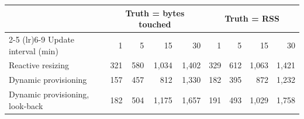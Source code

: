 \begin{tabular}{lrrrrrrrr}
\toprule
 & \multicolumn{4}{c}{Truth = bytes touched} & \multicolumn{4}{c}{Truth = RSS} \\
\cmidrule(lr){2-5} \cmidrule(lr){6-9}
Update interval (min) & 1 & 5 & 15 & 30 & 1 & 5 & 15 & 30 \\
\midrule
Reactive resizing & 321 & 580 & 1{,}034 & 1{,}402 & 329 & 612 & 1{,}063 & 1{,}421 \\
Dynamic provisioning & 157 & 457 & 812 & 1{,}330 & 182 & 395 & 872 & 1{,}232 \\
Dynamic provisioning, look-back & 182 & 504 & 1{,}175 & 1{,}657 & 191 & 493 & 1{,}029 & 1{,}758 \\
\bottomrule
\end{tabular}
